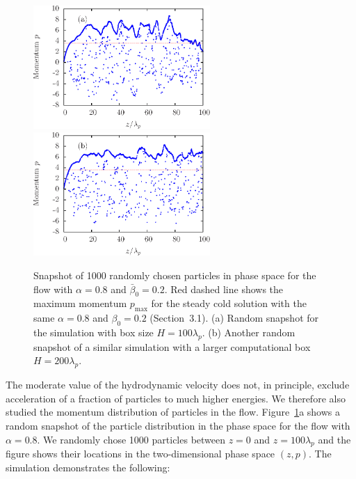 \begin{figure}%
\begin{center}
  \includegraphics[width=0.6\textwidth]{pics/chap2/f5a.eps}\\
  \includegraphics[width=0.6\textwidth]{pics/chap2/f5b.eps}
\caption{Snapshot of 1000 randomly chosen particles in phase space for the flow
with $\alpha=0.8$ and $\bar{\beta}_0=0.2$.
Red dashed line shows the maximum momentum $p_{\max}$ for the steady cold solution
with the same $\alpha=0.8$ and $\beta_0=0.2$ (Section~3.1).
(a) Random snapshot for the simulation with box size $H = 100\lambda_p$.
(b) Another random snapshot of a similar simulation with a larger computational box
$H = 200\lambda_p$.
 }
\label{fig:phasetraj}
\end{center}
\end{figure}


The moderate value of the hydrodynamic velocity does not, in principle, exclude
acceleration of a fraction of particles to much higher energies. We therefore also
studied the momentum distribution of particles in the flow.
Figure~\ref{fig:phasetraj}a shows a random snapshot of the particle distribution in the
phase space for the flow with $\alpha=0.8$.
We randomly chose 1000 particles between $z=0$ and $z=100\lambda_p$
and the figure shows their locations in the two-dimensional phase space $(z,p)$.
The simulation demonstrates the following:


